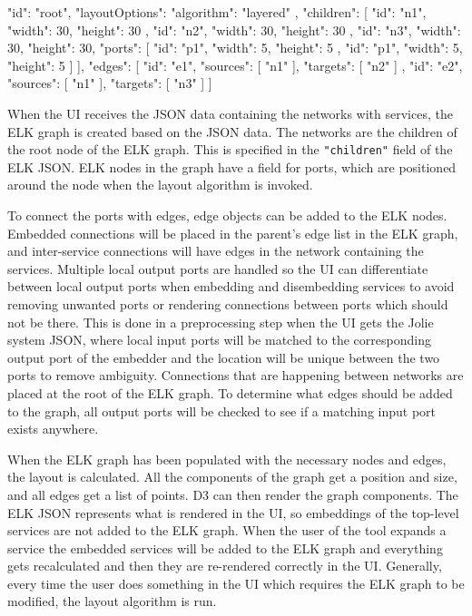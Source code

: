 \begin{jsonlisting}[][caption={The ELK JSON format}, label={lst:elk_json}]
{
    "id": "root",
    "layoutOptions": { "algorithm": "layered" },
    "children": [
        { "id": "n1", "width": 30, "height": 30 },
        { "id": "n2", "width": 30, "height": 30 },
        {
            "id": "n3",
            "width": 30,
            "height": 30,
            "ports": [
                { "id": "p1", "width": 5, "height": 5 },
                { "id": "p1", "width": 5, "height": 5 }
            ]
        }
    ],
    "edges": [
        { "id": "e1", "sources": [ "n1" ], "targets": [ "n2" ] },
        { "id": "e2", "sources": [ "n1" ], "targets": [ "n3" ] } 
    ]
}
\end{jsonlisting}

When the UI receives the JSON data containing the networks with services, the ELK graph is created based on the JSON data.
The networks are the children of the root node of the ELK graph. This is specified in the \texttt{"children"} field of the ELK JSON.
ELK nodes in the graph have a field for ports, which are positioned around the node when the layout algorithm is invoked.

To connect the ports with edges, edge objects can be added to the ELK nodes. Embedded connections will be placed in the parent's edge list in the ELK graph, and inter-service connections will have edges in the network containing the services.
Multiple local output ports are handled so the UI can differentiate between local output ports when embedding and disembedding services to avoid removing unwanted ports or rendering connections between ports which should not be there.
This is done in a preprocessing step when the UI gets the Jolie system JSON, where local input ports will be matched to the corresponding output port of the embedder and the location will be unique between the two ports to remove ambiguity.
Connections that are happening between networks are placed at the root of the ELK graph. To determine what edges should be added to the graph, all output ports will be checked to see if a matching input port exists anywhere.

When the ELK graph has been populated with the necessary nodes and edges, the layout is calculated. All the components of the graph get a position and size, and all edges get a list of points. D3 can then render the graph components.
The ELK JSON represents what is rendered in the UI, so embeddings of the top-level services are not added to the ELK graph. When the user of the tool expands a service the embedded services will be added to the ELK graph and
everything gets recalculated and then they are re-rendered correctly in the UI. Generally, every time the user does something in the UI which requires the ELK graph to be modified, the layout algorithm is run.

